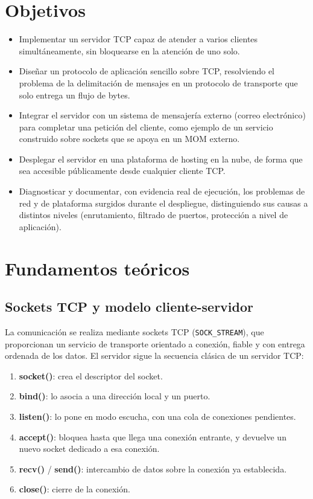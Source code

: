 \documentclass[12pt,a4paper]{article}
\begin{document}
\section{Objetivos}

\begin{itemize}
    \item Implementar un servidor TCP capaz de atender a varios clientes simultáneamente, sin bloquearse en la atención de uno solo.
    \item Diseñar un protocolo de aplicación sencillo sobre TCP, resolviendo el problema de la delimitación de mensajes en un protocolo de transporte que solo entrega un flujo de bytes.
    \item Integrar el servidor con un sistema de mensajería externo (correo electrónico) para completar una petición del cliente, como ejemplo de un servicio construido sobre sockets que se apoya en un MOM externo.
    \item Desplegar el servidor en una plataforma de hosting en la nube, de forma que sea accesible públicamente desde cualquier cliente TCP.
    \item Diagnosticar y documentar, con evidencia real de ejecución, los problemas de red y de plataforma surgidos durante el despliegue, distinguiendo sus causas a distintos niveles (enrutamiento, filtrado de puertos, protección a nivel de aplicación).
\end{itemize}


\section{Fundamentos teóricos}

\subsection{Sockets TCP y modelo cliente-servidor}

La comunicación se realiza mediante sockets TCP (\texttt{SOCK\_STREAM}), que proporcionan un servicio de transporte orientado a conexión, fiable y con entrega ordenada de los datos. El servidor sigue la secuencia clásica de un servidor TCP:

\begin{enumerate}
    \item \textbf{socket()}: crea el descriptor del socket.
    \item \textbf{bind()}: lo asocia a una dirección local y un puerto.
    \item \textbf{listen()}: lo pone en modo escucha, con una cola de conexiones pendientes.
    \item \textbf{accept()}: bloquea hasta que llega una conexión entrante, y devuelve un nuevo socket dedicado a esa conexión.
    \item \textbf{recv()} / \textbf{send()}: intercambio de datos sobre la conexión ya establecida.
    \item \textbf{close()}: cierre de la conexión.
\end{enumerate}
\end{document}
